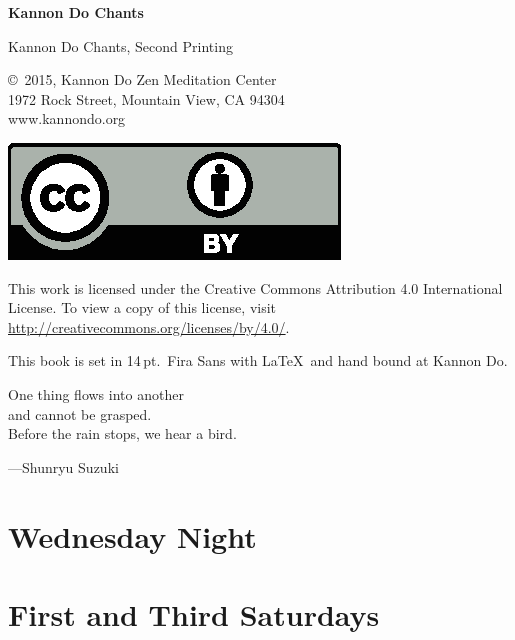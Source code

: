 \documentclass{kdo}
\begin{document}
\frontmatter
\begin{titlepage}
  \Huge\bf
Kannon Do Chants
\end{titlepage}

\begin{colophon}
Kannon Do Chants, Second Printing

\bigskip

\copyright\ 2015, Kannon Do Zen Meditation Center\\
1972 Rock Street, Mountain View, CA 94304\\
www.kannondo.org

\includegraphics{by}

This work is licensed under the Creative Commons Attribution 4.0 International
License. To view a copy of this license, visit\\
\url{http://creativecommons.org/licenses/by/4.0/}.

\bigskip

This book is set in 14\,pt.\ Fira Sans with \LaTeX\ and hand bound at Kannon Do.
\end{colophon}

\begin{dedication}
One thing flows into another\\
and cannot be grasped.\\
Before the rain stops, we hear a bird.

---Shunryu Suzuki
\end{dedication}

\cleardoublepage

\tableofcontents

\mainmatter

\chapter{Wednesday Night}
\heartOfGreatPerfectWisdomSutra
\allBuddhas
\sutraOpeningVerse
\fourVows

\chapter{First and Third Saturdays}
\paliRefuges
\makaHannyaHaramittaShingyo
\enmeiJukkuKannonGyo
\songOfTheJewelMirrorSamadhi
\ancestorsShort
\femaleAncestors
\jiHoSan
\end{document}
